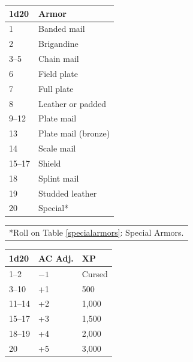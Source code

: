 \begin{multicols}{2}
\noindent \begin{minipage}{\columnwidth}

\label{armortype}
\noindent \begin{tabular}{|p{}|p{}|}
\hline
1d20	& Armor \\
\hline\hline
\rowcolor[gray]{.9}1	& Banded mail \\
2	& Brigandine \\
\rowcolor[gray]{.9}3--5	& Chain mail \\
6	& Field plate \\
\rowcolor[gray]{.9}7	& Full plate \\
8	& Leather or padded \\
\rowcolor[gray]{.9}9--12	& Plate mail \\
13	& Plate mail (bronze) \\
\rowcolor[gray]{.9}14	& Scale mail \\
15--17	& Shield \\
\rowcolor[gray]{.9}18	& Splint mail \\
19	& Studded leather \\
\rowcolor[gray]{.9}20	& Special* \\
\hline
\end{tabular}
\noindent\begin{tabular}{p{}}
*Roll on Table \ref{specialarmors}: Special Armors. \\
\end{tabular}\vspace{.5em}

\end{minipage}

\noindent \begin{minipage}{\columnwidth}

\label{armorenchant}

\noindent \begin{tabular}{|p{}|p{}|p{}|}
\hline
1d20	& AC Adj.	& XP \\
\hline\hline
\rowcolor[gray]{.9}1--2	& $-1$	& Cursed \\
3--10	& +1	& 500 \\
\rowcolor[gray]{.9}11--14	& +2	& 1,000 \\
15--17	& +3	& 1,500 \\
\rowcolor[gray]{.9}18--19	& +4	& 2,000 \\
20	& +5	& 3,000 \\
\hline
\end{tabular}


\end{minipage}
\end{multicols}
